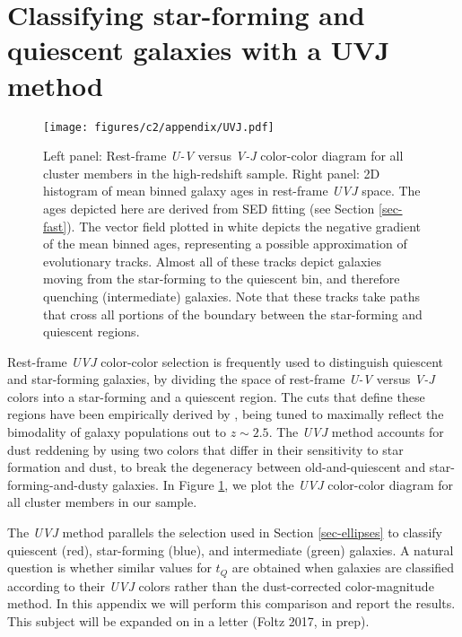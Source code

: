 \section{Classifying star-forming and quiescent galaxies with a UVJ method}\label{sec-a-uvj}

\begin{figure}
\centering \texttt{[image: figures/c2/appendix/UVJ.pdf]}
\caption[Mean binned galaxy ages in rest-frame 	extit{UVJ} space]{Left panel: Rest-frame \textit{U-V} versus \textit{V-J} color-color diagram for all cluster members in the high-redshift sample.
Right panel: 2D histogram of mean binned galaxy ages in rest-frame \textit{UVJ} space.
The ages depicted here are derived from SED fitting (see Section \ref{sec-fast}).
The vector field plotted in white depicts the negative gradient of the mean binned ages, representing a possible approximation of evolutionary tracks.
Almost all of these tracks depict galaxies moving from the star-forming to the quiescent bin, and therefore quenching (intermediate) galaxies.
Note that these tracks take paths that cross all portions of the boundary between the star-forming and quiescent regions.
\label{fig-a-UVJ}}
\end{figure}

Rest-frame \textit{UVJ} color-color selection is frequently used to distinguish quiescent and star-forming galaxies, by dividing the space of rest-frame \textit{U-V} versus \textit{V-J} colors into a star-forming and a quiescent region.
The cuts that define these regions have been empirically derived by \citet{Williams:2009tt}, being tuned to maximally reflect the bimodality of galaxy populations out to $z\sim2.5$.
The \textit{UVJ} method accounts for dust reddening by using two colors that differ in their sensitivity to star formation and dust, to break the degeneracy between old-and-quiescent and star-forming-and-dusty galaxies.
In Figure \ref{fig-a-UVJ}, we plot the \textit{UVJ} color-color diagram for all cluster members in our sample.

The \textit{UVJ} method parallels the selection used in Section \ref{sec-ellipses} to classify quiescent (red), star-forming (blue), and intermediate (green) galaxies.
A natural question is whether similar values for $t_Q$ are obtained when galaxies are classified according to their \textit{UVJ} colors rather than the dust-corrected color-magnitude method.
In this appendix we will perform this comparison and report the results.
This subject will be expanded on in a letter (Foltz 2017, in prep).


